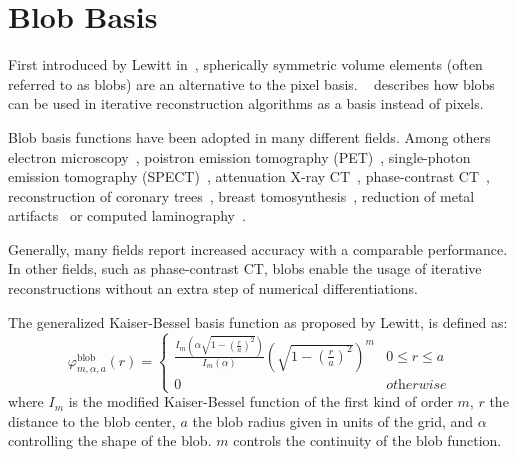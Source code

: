 \section{Blob Basis}\label{sec:blob_basis}

First introduced by Lewitt in~\cite{lewitt_multidimensional_1990}, spherically symmetric volume
elements (often referred to as blobs) are an alternative to the pixel basis.
~\cite{lewitt_alternatives_1992} describes how blobs can be used in iterative reconstruction
algorithms as a basis instead of pixels.

Blob basis functions have been adopted in many different fields. Among others electron
microscopy~\cite{marabini_3d_1998, garduno_optimization_2001}, poistron emission tomography
(PET)~\cite{jacobs_comparative_1999, chlewicki_noise_2004}, single-photon emission tomography
(SPECT)~\cite{wang_3d_2004, yendiki_comparison_2004}, attenuation X-ray
CT~\cite{jacobs_iterative_1999, carvalho_helical_2003, isola_motion-compensated_2008},
phase-contrast CT~\cite{kohler_iterative_2011, xu_investigation_2012}, reconstruction of coronary
trees~\cite{zhou_blob-based_2008}, breast tomosynthesis~\cite{wu_breast_2010}, reduction of metal
artifacts~\cite{levakhina_two-step_2010} or computed laminography~\cite{trampert_spherically_2017}.


Generally, many fields report increased accuracy with a comparable performance. In other fields,
such as phase-contrast CT, blobs enable the usage of iterative reconstructions without an extra step
of numerical differentiations.

The generalized Kaiser-Bessel basis function as proposed by Lewitt, is defined as:
\begin{equation}\label{eq:blob_basis_fn}
	\varphi^{\text{blob}}_{m, \alpha, a}(r) =
	\begin{cases}
		\frac{I_m\left( \alpha \sqrt{1 - \left(\frac{r}{a}\right)^2} \right)} {I_m\left( \alpha \right)} \left( \sqrt{1 - \left(\frac{r}{a}\right)^2}\right)^m & 0 \le r \le a      \\
		0                                                                                                                                                      & \textit{otherwise}
	\end{cases}
\end{equation}
where \(I_m\) is the modified Kaiser-Bessel function of the first kind of order \(m\), \(r\) the
distance to the blob center, \(a\) the blob radius given in units of the grid, and \(\alpha\)
controlling the shape of the blob. \(m\) controls the continuity of the blob function.

